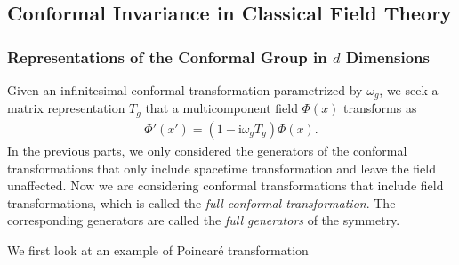 \documentclass[10pt]{article}
\newcommand{\ii}{\mathrm{i}}
\begin{document}
\subsection{Conformal Invariance in Classical Field Theory}
\subsubsection{Representations of the Conformal Group in \texorpdfstring{$d$}{d} Dimensions}
\begin{intu}
Given an infinitesimal conformal transformation parametrized by $\omega_g$, we seek a matrix representation $T_g$ that a multicomponent field $\Phi(x)$ transforms as 
\begin{align}
    \Phi'(x')=(1-\ii\omega_g T_g)\Phi(x).
\end{align}
In the previous parts, we only considered the generators of the conformal transformations that only include spacetime transformation and leave the field unaffected.
Now we are considering conformal transformations that include field transformations, which is called the \textit{full conformal transformation}.
The corresponding generators are called the \textit{full generators} of the symmetry. 
\end{intu}
We first look at an example of Poincar\'e transformation
\end{document}
